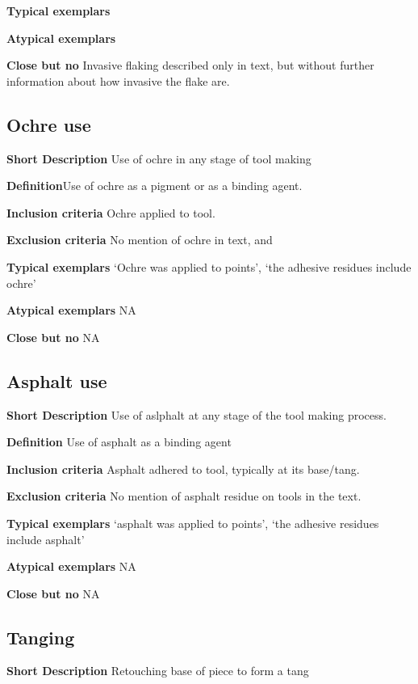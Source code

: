 \documentclass[
]{article}
\begin{document}
\textbf{Typical exemplars}

\textbf{Atypical exemplars}

\textbf{Close but no} Invasive flaking described only in text, but
without further information about how invasive the flake are.

\hypertarget{ochre-use}{%
\subsection{Ochre use}\label{ochre-use}}

\textbf{Short Description} Use of ochre in any stage of tool making

\textbf{Definition}Use of ochre as a pigment or as a binding agent.

\textbf{Inclusion criteria} Ochre applied to tool.

\textbf{Exclusion criteria} No mention of ochre in text, and

\textbf{Typical exemplars} `Ochre was applied to points', `the adhesive
residues include ochre'

\textbf{Atypical exemplars} NA

\textbf{Close but no} NA

\hypertarget{asphalt-use}{%
\subsection{Asphalt use}\label{asphalt-use}}

\textbf{Short Description} Use of aslphalt at any stage of the tool
making process.

\textbf{Definition} Use of asphalt as a binding agent

\textbf{Inclusion criteria} Asphalt adhered to tool, typically at its
base/tang.

\textbf{Exclusion criteria} No mention of asphalt residue on tools in
the text.

\textbf{Typical exemplars} `asphalt was applied to points', `the
adhesive residues include asphalt'

\textbf{Atypical exemplars} NA

\textbf{Close but no} NA

\hypertarget{tanging}{%
\subsection{Tanging}\label{tanging}}

\textbf{Short Description} Retouching base of piece to form a tang
\end{document}
